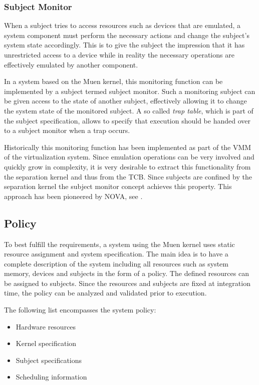 \subsubsection{Subject Monitor}
When a subject tries to access resources such as devices that are emulated, a
system component must perform the necessary actions and change the subject's
system state accordingly. This is to give the subject the impression that it
has unrestricted access to a device while in reality the necessary operations
are effectively emulated by another component.

In a system based on the Muen kernel, this monitoring function can be
implemented by a subject termed subject monitor. Such a monitoring subject can
be given access to the state of another subject, effectively allowing it to
change the system state of the monitored subject. A so called \emph{trap
table}, which is part of the subject specification, allows to specify that
execution should be handed over to a subject monitor when a trap occurs.

Historically this monitoring function has been implemented as part of the VMM
of the virtualization system. Since emulation operations can be very involved
and quickly grow in complexity, it is very desirable to extract this
functionality from the separation kernel and thus from the TCB. Since subjects
are confined by the separation kernel the subject monitor concept achieves this
property. This approach has been pioneered by NOVA, see
\cite{Steinberg:2010:NMS:1755913.1755935}.

\subsection{Policy}\label{subsec:policy}
To best fulfill the requirements, a system using the Muen kernel uses static
resource assignment and system specification. The main idea is to have a
complete description of the system including all resources such as system
memory, devices and subjects in the form of a policy. The defined
resources can be assigned to subjects. Since the resources and subjects are
fixed at integration time, the policy can be analyzed and validated prior to
execution.

The following list encompasses the system policy:
\begin{itemize}
	\item Hardware resources
	\item Kernel specification
	\item Subject specifications
	\item Scheduling information
\end{itemize}

